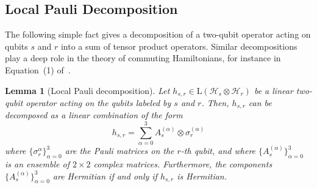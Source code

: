 \documentclass[a4paper,onecolumn,11pt]{quantumarticle}
\theoremstyle{plain}
\newtheorem{lemma}[theorem]{Lemma}
\begin{document}
\subsection{Local Pauli Decomposition}
The following simple fact gives a decomposition of a two-qubit operator acting on qubits $s$ and $r$ into a sum of tensor product operators. Similar decompositions play a deep role in the theory of commuting Hamiltonians, for instance in Equation~(1) of~\cite{aharonov2011complexity}.

\begin{lemma}[Local Pauli decomposition]\label{algebra-fact-pauli-decomposition}
    Let $h_{s,r} \in \mathrm{L}(\mathcal{H}_s \otimes \mathcal{H}_r)$ be a linear two-qubit operator acting on the qubits labeled by $s$ and $r$. Then, $h_{s,r}$ can be decomposed as a linear combination of the form
    \begin{equation}\label{eqn:local-pauli-decomposition}
        h_{s,r} = \sum\limits_{\alpha = 0}^{3} A_s^{(\alpha)} \otimes \sigma_r^{(\alpha)}
    \end{equation}
where $\{\sigma_r^{\alpha}\}_{\alpha=0}^3$ are the Pauli matrices on the $r$-th qubit, and where $\{A_s^{(\alpha)}\}_{\alpha=0}^3$ is an ensemble of $2 \times 2$ complex matrices. Furthermore, the components $\{A_s^{(\alpha)}\}_{\alpha=0}^3$ are Hermitian if and only if $h_{s, r}$ is Hermitian.
\end{lemma}
\end{document}
